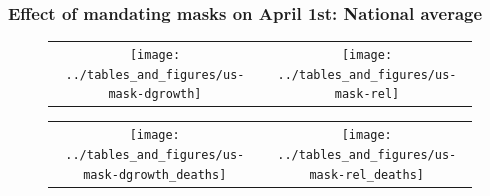 \documentclass{beamer}
\begin{document}
\begin{frame}
  \frametitle{Effect of mandating masks on April 1st: National average }

\begin{figure}[ht]
  \begin{minipage}{\linewidth}
    \centering
    \begin{tabular}{cc}
      \texttt{[image: ../tables\_and\_figures/us-mask-dgrowth]}
      &
        \texttt{[image: ../tables\_and\_figures/us-mask-rel]}
    \end{tabular}
  \end{minipage}
\end{figure}

\begin{figure}[ht]
  \begin{minipage}{\linewidth}
    \centering
    \begin{tabular}{cc}
      \texttt{[image: ../tables\_and\_figures/us-mask-dgrowth\_deaths]}
      &
        \texttt{[image: ../tables\_and\_figures/us-mask-rel\_deaths]}
    \end{tabular}
  \end{minipage}
\end{figure}


\end{frame}






\end{document}
